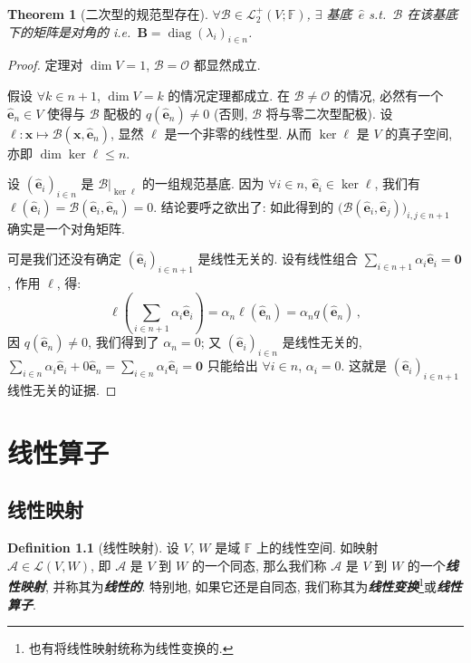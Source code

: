 \documentclass[openany]{ctexbook}
\newcommand*{\indexbf}[1]{\emph{\textbf{#1}}\index{#1}} %
\theoremstyle{plain}
\newtheorem{theorem}{Theorem}[section] %
\theoremstyle{definition}
\newtheorem{definition}{Definition}[section] %
\newcommand*{\basis}[1]{\hat{\boldsymbol{#1}}} %
\newcommand*{\bv}{\boldsymbol} %
\newcommand*{\inbasis}[2]{\left.%
	{#1}\right|_{#2}
}
\DeclareMathOperator{\diag}{diag}
\begin{document}
\begin{theorem}[二次型的规范型存在]
	$\forall \mathscr B \in \mathcal L^+_2(V; \mathbb F)$, $\exists$ 基底~$\hat e$ s.t.\ $\mathscr B$ 在该基底下的矩阵是对角的 i.e.\ $\bv B = \diag(\lambda_i)_{i \in n}$.
\end{theorem}
\begin{proof}
	定理对 $\dim V = 1$, $\mathscr B = \mathscr O$ 都显然成立. 

	假设 $\forall k \in n + 1$, $\dim V = k$ 的情况定理都成立. 
	在 $\mathscr B \neq \mathscr O$ 的情况, 必然有一个 $\basis e_n \in V$ 使得与 $\mathscr B$ 配极的 $q(\basis e_n) \neq 0$ 
		(否则, $\mathscr B$ 将与零二次型配极).
	设 $\ell \colon \bv x \mapsto \mathscr B(\bv x, \basis e_n)$, 显然 $\ell$ 是一个非零的线性型. 
	从而 $\ker \ell$ 是 $V$ 的真子空间, 亦即 $\dim \ker \ell \leq n $.

	设 $(\basis e_i)_{i \in n}$ 是 $\inbasis{\mathscr B}{\ker \ell}$ 的一组规范基底. 
	因为 $\forall i \in n$, $\basis e_i \in \ker \ell$, 我们有 $\ell(\basis e_i) = \mathscr B(\basis e_i, \basis e_n) = 0$. 
	结论要呼之欲出了: 如此得到的 $\big(\mathscr B(\basis e_i, \basis e_j)\big)_{i, j \in n + 1}$ 确实是一个对角矩阵.

	可是我们还没有确定 $(\basis e_i)_{i \in n + 1}$ 是线性无关的. 
	设有线性组合 $\sum_{i \in n + 1} \alpha_i \basis e_i = \bv 0$, 作用 $\ell$, 得:
	\begin{equation*}
		\ell\left( 
			\sum_{i \in n + 1} \alpha_i \basis e_i
		 \right)
		= \alpha_n \ell(\basis e_n)
		= \alpha_n q(\basis e_n)\,,
	\end{equation*}
	因 $q(\basis e_n) \neq 0$, 我们得到了 $\alpha_n = 0$; 
	又 $(\basis e_i)_{i \in n}$ 是线性无关的, $\sum_{i \in n} \alpha_i \basis e_i + 0\basis e_n = \sum_{i \in n} \alpha_i \basis e_i = \bv 0$ 只能给出 $\forall i \in n$, $\alpha_i = 0$. 这就是 $(\basis e_i)_{i \in n + 1}$ 线性无关的证据.

\end{proof}

\chapter{线性算子}
\section{线性映射}
	\label{section:线性映射}

\begin{definition}[线性映射]
	设 $V$, $W$ 是域 $\mathbb F$ 上的线性空间. 
	如映射 $\mathscr A \in \mathcal L (V, W)$, 即 $\mathscr A$ 是 $V$ 到 $W$ 的一个同态, 那么我们称 $\mathscr A$ 是 $V$ 到 $W$ 的一个\indexbf{线性映射}, 并称其为\indexbf{线性的}. 特别地, 如果它还是自同态, 我们称其为\indexbf{线性变换}\footnote{也有将线性映射统称为线性变换的. }或\indexbf{线性算子}.
\end{definition}
\end{document}
